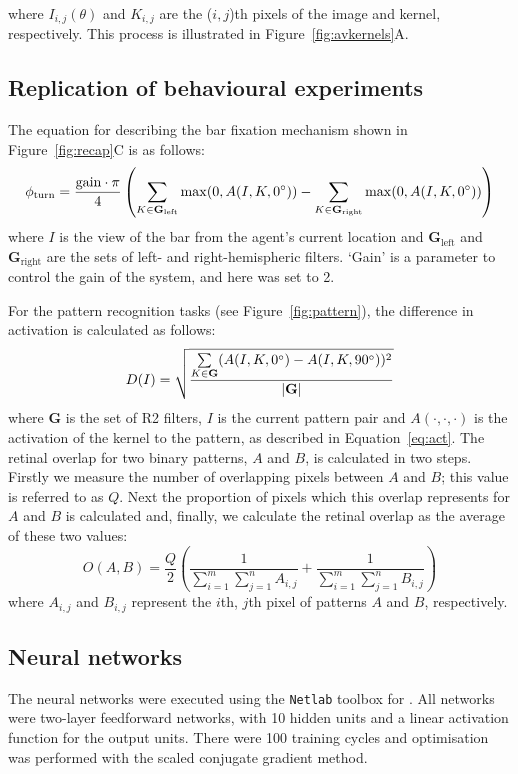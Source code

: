 where $I_{i,j}(\theta)$ and $K_{i,j}$ are the ($i,j$)th pixels of the image and kernel, respectively. This process is illustrated in Figure~\ref{fig:avkernels}A.

\subsection*{Replication of behavioural experiments}
\label{sec:methods:replication}
The equation for describing the bar fixation mechanism shown in Figure~\ref{fig:recap}C is as follows:
$$
\phi_\mathrm{turn} = \frac{\mathrm{gain}\cdot \pi}{4}\left( \sum\limits_{K\in \mathbf{G}_\mathrm{left}}\max(0,A(I,K,0\degree)) - \sum\limits_{K\in \mathbf{G}_\mathrm{right}}\max(0,A(I,K,0\degree)) \right)
$$
where $I$ is the view of the bar from the agent's current location and $\mathbf{G}_\mathrm{left}$ and $\mathbf{G}_\mathrm{right}$ are the sets of left- and right-hemispheric filters. `Gain' is a parameter to control the gain of the system, and here was set to 2.

For the pattern recognition tasks (see Figure~\ref{fig:pattern}), the difference in activation is calculated as follows:
$$
D(I) = \sqrt{\frac{\sum\limits_{K\in \mathbf{G}}(A(I,K,0\degree)-A(I,K,90\degree))^2}{|\mathbf{G}|}}
$$
where $\mathbf{G}$ is the set of R2 filters, $I$ is the current pattern pair and $A(\cdot,\cdot,\cdot)$ is the activation of the kernel to the pattern, as described in Equation~\ref{eq:act}.
The retinal overlap for two binary patterns, $A$ and $B$, is calculated in two steps. Firstly we measure the number of overlapping pixels between $A$ and $B$; this value is referred to as $Q$. Next the proportion of pixels which this overlap represents for $A$ and $B$ is calculated and, finally, we calculate the retinal overlap as the average of these two values:
$$
O(A,B) = \frac{Q}{2} \left( \frac{1}{\sum\limits_{i=1}^m \sum\limits_{j=1}^n A_{i,j}} + \frac{1}{\sum\limits_{i=1}^m \sum\limits_{j=1}^n B_{i,j}} \right)
$$
where $A_{i,j}$ and $B_{i,j}$ represent the $i$th, $j$th pixel of patterns $A$ and $B$, respectively.

\subsection*{Neural networks}
\label{sec:methods:neuralnetworks}
The neural networks were executed using the \texttt{Netlab} toolbox for \Matlab.
All networks were two-layer feedforward networks, with 10 hidden units and a linear activation function for the output units.
There were 100 training cycles and optimisation was performed with the scaled conjugate gradient method.

